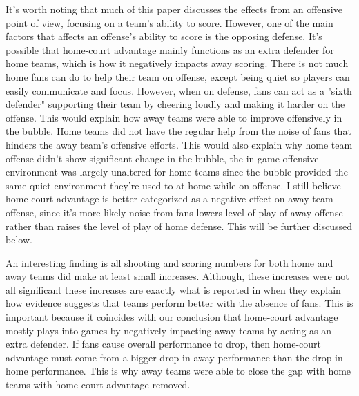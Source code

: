 \documentclass[10pt]{article}
\begin{document}
It's worth noting that much of this paper discusses the effects from an
offensive point of view, focusing on a team's ability to score. However, one of 
the main factors that affects an offense's ability to score is the opposing
defense. It's possible that home-court advantage mainly functions as an extra
defender for home teams, which is how it negatively impacts away scoring. There
is not much home fans can do to help their team on offense, except being quiet
so players can easily communicate and focus. However, when on defense, fans can
act as a "sixth defender" supporting their team by cheering loudly and making it
harder on the offense. This would explain how away teams were able to improve
offensively in the bubble. Home teams did not have the regular help from the
noise of fans that hinders the away team's offensive efforts. This would also
explain why home team offense didn't show significant change in the bubble, the
in-game offensive environment was largely unaltered for home teams since the
bubble provided the same quiet environment they're used to at home while on
offense. I still believe home-court advantage is better categorized as a
negative effect on away team offense, since it's more likely
noise from fans lowers level of play of away offense rather than raises the level
of play of home defense. This will be further discussed below.

An interesting finding is all shooting and scoring numbers for both home and
away teams did make at least small increases. Although, these increases
were not all significant these increases are exactly what is reported in
\citet{Carron2005} when they explain how evidence suggests that teams perform
better with the absence of fans. This is important because it coincides with our
conclusion that home-court advantage mostly plays into games by negatively impacting 
away teams by acting as an extra defender. If fans cause overall performance to drop,
then home-court advantage must come from a bigger drop in away performance than the 
drop in home performance. This is why away teams were able to close the gap with 
home teams with home-court advantage removed.
\end{document}
